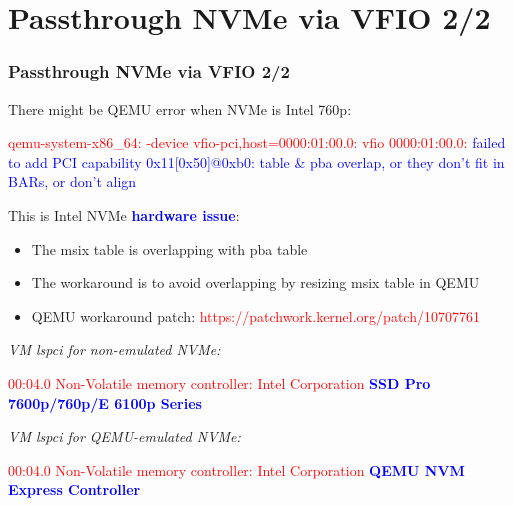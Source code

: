 \documentclass[aspectratio=169]{beamer}
\begin{document}
\section{Passthrough NVMe via VFIO 2/2}
\begin{frame}
\frametitle{Passthrough NVMe via VFIO 2/2}
\begin{block}{}
There might be QEMU error when NVMe is Intel 760p:

{\small \textcolor{red}{qemu-system-x86\_64: -device vfio-pci,host=0000:01:00.0: vfio 0000:01:00.0:} \textcolor{blue}{failed to add PCI capability 0x11[0x50]@0xb0: table \& pba overlap, or they don't fit in BARs, or don't align}} \newline

This is Intel NVMe \textbf{\textcolor{blue}{hardware issue}}:
\begin{itemize}
\item The msix table is overlapping with pba table
\item The workaround is to avoid overlapping by resizing msix table in QEMU
\item QEMU workaround patch: \textcolor{red}{https://patchwork.kernel.org/patch/10707761}
\end{itemize}
\end{block}
\begin{block}{}
\small
\textit{VM lspci for non-emulated NVMe:}

\textcolor{red}{00:04.0 Non-Volatile memory controller: Intel Corporation \textbf{\textcolor{blue}{SSD Pro 7600p/760p/E 6100p Series}}}

\vspace{2 mm}

\textit{VM lspci for QEMU-emulated NVMe:}

\textcolor{red}{00:04.0 Non-Volatile memory controller: Intel Corporation \textbf{\textcolor{blue}{QEMU NVM Express Controller}}}
\end{block}
\end{frame}

\end{document}
